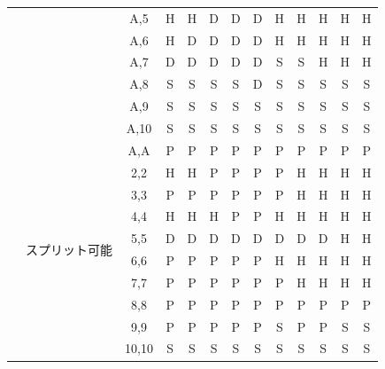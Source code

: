 \begin{table}[H]
\begin{center}
\begin{tabular}{|c|c|c|c|c|c|c|c|c|c|c|c|c|}
                            &                           & A,5   & H & H & D & D & D & H & H & H & H  & H \\ \cline{3-13} 
                            &                           & A,6   & H & D & D & D & D & H & H & H & H  & H \\ \cline{3-13} 
                            &                           & A,7   & D & D & D & D & D & S & S & H & H  & H \\ \cline{3-13} 
                            &                           & A,8   & S & S & S & S & D & S & S & S & S  & S \\ \cline{3-13} 
                            &                           & A,9   & S & S & S & S & S & S & S & S & S  & S \\ \cline{3-13} 
                            &                           & A,10  & S & S & S & S & S & S & S & S & S  & S \\ \cline{2-13} 
                            & \multirow{10}{*}{スプリット可能} & A,A   & P & P & P & P & P & P & P & P & P  & P \\ \cline{3-13} 
                            &                           & 2,2   & H & H & P & P & P & P & H & H & H  & H \\ \cline{3-13} 
                            &                           & 3,3   & P & P & P & P & P & P & H & H & H  & H \\ \cline{3-13} 
                            &                           & 4,4   & H & H & H & P & P & H & H & H & H  & H \\ \cline{3-13} 
                            &                           & 5,5   & D & D & D & D & D & D & D & D & H  & H \\ \cline{3-13} 
                            &                           & 6,6   & P & P & P & P & P & H & H & H & H  & H \\ \cline{3-13} 
                            &                           & 7,7   & P & P & P & P & P & P & H & H & H  & H \\ \cline{3-13} 
                            &                           & 8,8   & P & P & P & P & P & P & P & P & P  & P \\ \cline{3-13} 
                            &                           & 9,9   & P & P & P & P & P & S & P & P & S  & S \\ \cline{3-13} 
                            &                           & 10,10 & S & S & S & S & S & S & S & S & S  & S \\ \hline
    \end{tabular}
    \end{center}
\end{table}
